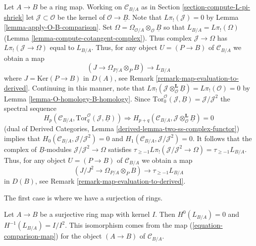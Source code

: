 \begin{remark}
\label{remark-make-map}
Let $A \to B$ be a ring map.  Working on $\mathcal{C}_{B/A}$ as in
Section \ref{section-compute-L-pi-shriek} let
$\mathcal{J} \subset \mathcal{O}$ be the kernel of
$\mathcal{O} \to \underline{B}$. Note that $L\pi_!(\mathcal{J}) = 0$ by
Lemma \ref{lemma-apply-O-B-comparison}. Set
$\Omega =  \Omega_{\mathcal{O}/A} \otimes_\mathcal{O} \underline{B}$
so that
$L_{B/A} = L\pi_!(\Omega)$ (Lemma \ref{lemma-compute-cotangent-complex}).
Thus complex $\mathcal{J} \to \Omega$
has $L\pi_!(\mathcal{J} \to \Omega)$ equal to $L_{B/A}$.
Thus, for any object $U = (P \to B)$ of $\mathcal{C}_{B/A}$ we obtain a map
\begin{equation}
\label{equation-comparison-map-A}
(J \to \Omega_{P/A} \otimes_P B) \longrightarrow L_{B/A}
\end{equation}
where $J = \text{Ker}(P \to B)$ in $D(A)$, see
Remark \ref{remark-map-evaluation-to-derived}.
Continuing in this manner, note that
$L\pi_!(\mathcal{J} \otimes_\mathcal{O}^\mathbf{L} \underline{B}) =
L\pi_!(\mathcal{O}) = 0$ by
Lemma \ref{lemma-O-homology-B-homology}.
Since $\text{Tor}_0^\mathcal{O}(\mathcal{J}, \underline{B}) =
\mathcal{J}/\mathcal{J}^2$
the spectral sequence
$$
H_p(\mathcal{C}_{B/A}, \text{Tor}_q^\mathcal{O}(\mathcal{J}, \underline{B}))
\Rightarrow 
H_{p + q}(\mathcal{C}_{B/A},
\mathcal{J} \otimes_\mathcal{O}^\mathbf{L} \underline{B}) = 0
$$
(dual of
Derived Categories, Lemma \ref{derived-lemma-two-ss-complex-functor})
implies that
$H_0(\mathcal{C}_{B/A}, \mathcal{J}/\mathcal{J}^2) = 0$
and $H_1(\mathcal{C}_{B/A}, \mathcal{J}/\mathcal{J}^2) = 0$.
It follows that the complex of $\underline{B}$-modules
$\mathcal{J}/\mathcal{J}^2 \to \Omega$ satisfies
$\tau_{\geq -1}L\pi_!(\mathcal{J}/\mathcal{J}^2 \to \Omega) =
\tau_{\geq -1}L_{B/A}$.
Thus, for any object $U = (P \to B)$ of $\mathcal{C}_{B/A}$ we obtain a map
\begin{equation}
\label{equation-comparison-map}
(J/J^2 \to \Omega_{P/A} \otimes_P B) \longrightarrow \tau_{\geq -1}L_{B/A}
\end{equation}
in $D(B)$, see Remark \ref{remark-map-evaluation-to-derived}.
\end{remark}

\noindent
The first case is where we have a surjection of rings.

\begin{lemma}
\label{lemma-surjection}
Let $A \to B$ be a surjective ring map with kernel $I$.
Then $H^0(L_{B/A}) = 0$ and $H^{-1}(L_{B/A}) = I/I^2$.
This isomorphism comes from the map (\ref{equation-comparison-map})
for the object $(A \to B)$ of $\mathcal{C}_{B/A}$.
\end{lemma}

